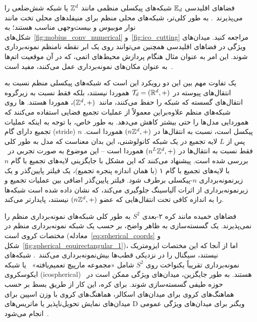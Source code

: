 فضاهای اقلیدسی $\mathbb{E}_d$ شبکه‌های پیکسلی منظمی مانند $\mathbb{Z}^d$ یا شبکه شش‌ضلعی را می‌پذیرند~\cite{Hoogeboom2018-HEX}.
به طور کلی‌تر، شبکه‌های محلی منظم برای منیفلدهای محلی تخت مانند نوار موبیوس و بیست‌وجهی مناسب هستند؛ به شکل‌های~\ref{fig:mobius_conv_numerical} و~\ref{fig:ico_cutting} مراجعه کنید.
میدان‌های ویژگی در فضاهای اقلیدسی همچنین می‌توانند روی یک ابر نقطه نامنظم نمونه‌برداری شوند.
این امر به عنوان مثال هنگام پردازش محیط‌های اتمی، که در آن موقعیت اتم‌ها به عنوان مکان‌های نمونه‌برداری عمل می‌کنند، مفید است~\cite{Thomas2018-TFN}.

یک تفاوت مهم بین این دو رویکرد این است که شبکه‌های پیکسلی منظم نسبت به انتقال‌های پیوسته در $\mathcal{T}_d = (\mathbb{R}^d,+)$ هموردا نیستند، بلکه فقط نسبت به زیرگروه انتقال‌های گسسته که شبکه را حفظ می‌کنند، مانند~$(\mathbb{Z}^d,+)$، هموردا هستند.
\CNN ها روی شبکه‌های منظم علاوه‌براین معمولاً از عملیات تجمیع فضایی استفاده می‌کنند که هموردایی مدل‌ها را حتی بیشتر کاهش می‌دهد.
به طور خاص، با توجه به اینکه عملیات تجمیع دارای گام (stride) $n$ پیکسل است، نسبت به انتقال‌ها در $(n\mathbb{Z}^d,+)$ هموردا است.
پس از $L$ لایه تجمیع در یک شبکه کانولوشنی، این بدان معناست که مدل به طور کلی فقط نسبت به انتقال‌ها در $(n^L\mathbb{Z}^d,+)$ هموردا است
-- این موضوع به صورت تجربی در~\cite{azulay2018shift} بررسی شده است.
\citet{zhang2019CNNsShiftInvariant} پیشنهاد می‌کنند که این مشکل با جایگزینی لایه‌های تجمیع با گام $n$ با لایه‌های تجمیع با گام ۱ (با همان اندازه پنجره تجمیع)، یک فیلتر پایین‌گذر و یک زیرنمونه‌برداری $n$-پیکسلی برطرف شود.
فیلتر پایین‌گذر اضافی بین عملیات تجمیع و زیرنمونه‌برداری از اثرات آلیاسینگ جلوگیری می‌کند، که نشان داده شده است شبکه‌ها را به اندازه کافی تحت انتقال‌هایی که عضو $(n\mathbb{Z}^d,+)$ نیستند، پایدارتر می‌کند.

فضاهای خمیده مانند کره ۲-بعدی $S^2$ به طور کلی شبکه‌های نمونه‌برداری منظم را نمی‌پذیرند.
یک گسسته‌سازی به ظاهر واضح، بر حسب یک شبکه نمونه‌برداری منظم در مختصات کروی است (معادله~\eqref{eq:spherical_coords} و شکل~\ref{fig:spherical_equirectangular_1})، اما از آنجا که این مختصات ایزومتریک نیستند، سیگنال را در نزدیکی قطب‌ها بیش‌نمونه‌برداری می‌کنند~\cite{zhao2018distortion,tateno2018distortion}.
شبکه‌های نمونه‌برداری تقریباً یکنواخت روی $S^2$ شامل «مجموعه مارپیچ تعمیم‌یافته»~\cite{coors2018spherenet} یا شبکه ایکوسکروی (icospherical)~\cite{jiang2019spherical,kicanaoglu2019gaugeSphere} هستند.
به طور جایگزین، میدان‌های ویژگی ممکن است در حوزه طیفی گسسته‌سازی شوند.
برای کره، این کار از طریق بسط بر حسب هماهنگ‌های کروی برای میدان‌های اسکالر، هماهنگ‌های کروی با وزن اسپین برای میدان‌های نمایش تحویل‌ناپذیر یا ماتریس‌های D ویگنر برای میدان‌های ویژگی عمومی انجام می‌شود~\cite{esteves2018zonalSpherical,esteves2020spinweighted,Cohen2018-S2CNN,kondor2018ClebschGordan}.

